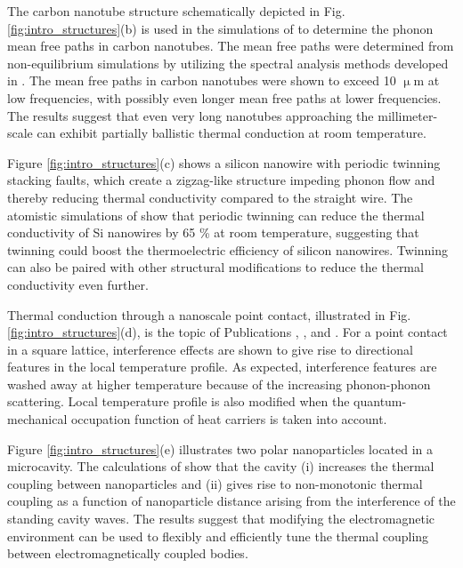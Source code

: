 The carbon nanotube structure schematically depicted in Fig. \ref{fig:intro_structures}(b) is used in the simulations of  to determine the phonon mean free paths in carbon nanotubes. The mean free paths were determined from non-equilibrium simulations by utilizing the spectral analysis methods developed in . The mean free paths in carbon nanotubes were shown to exceed 10 $\upmu$m at low frequencies, with possibly even longer mean free paths at lower frequencies. The results suggest that even very long nanotubes approaching the millimeter-scale can exhibit partially ballistic thermal conduction at room temperature. 

Figure \ref{fig:intro_structures}(c) shows a silicon nanowire with periodic twinning stacking faults, which create a zigzag-like structure impeding phonon flow and thereby reducing thermal conductivity compared to the straight wire. The atomistic simulations of  show that periodic twinning can reduce the thermal conductivity of Si nanowires by 65 \% at room temperature, suggesting that twinning could boost the thermoelectric efficiency of silicon nanowires. Twinning can also be paired with other structural modifications to reduce the thermal conductivity even further.

Thermal conduction through a nanoscale point contact, illustrated in Fig. \ref{fig:intro_structures}(d), is the topic of Publications , , and . For a point contact in a square lattice, interference effects are shown to give rise to directional features in the local temperature profile. As expected, interference features are washed away at higher temperature because of the increasing phonon-phonon scattering. Local temperature profile is also modified when the quantum-mechanical occupation function of heat carriers is taken into account. 

Figure \ref{fig:intro_structures}(e) illustrates two polar nanoparticles located in a microcavity. The calculations of  show that the cavity (i) increases the thermal coupling between nanoparticles and (ii) gives rise to non-monotonic thermal coupling as a function of nanoparticle distance arising from the interference of the standing cavity waves. The results suggest that modifying the electromagnetic environment can be used to flexibly and efficiently tune the thermal coupling between electromagnetically coupled bodies.


